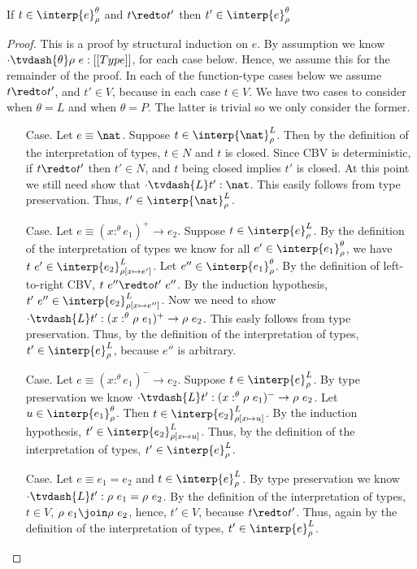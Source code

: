 \begin{lemma}[$\CRII$]
  \label{lemma:crii}
  If $t \in \interp{e}^\theta_\rho$ and $t \redto t'$ then $t' \in \interp{e}^\theta_\rho$
\end{lemma}
\begin{proof}
  This is a proof by structural induction on $e$.  By assumption we know 
  $\cdot \tvdash{\theta} \rho\ e:[[Type]]$, for each case below.  Hence, we assume this for
  the remainder of the proof.  In each of the function-type cases below we 
  assume $t \redto t'$, and $t' \in V$, because in each case $t \in V$.  We have two cases
  to consider when $\theta = L$ and when $\theta = P$.  The latter is trivial so we only
  consider the former.

  \begin{itemize}
  \item[Case.] Let $e \equiv \nat$.  
    Suppose $t \in \interp{\nat}^L_\rho$.  Then by the definition of the 
    interpretation of types, $t \in N$ and $t$ is closed.  Since CBV is deterministic,
    if $t \redto t'$ then $t' \in N$, and $t$ being closed implies $t'$ is closed.  At this
    point we still need show that $\cdot \tvdash{L} t':\nat$.  This easily follows from
    type preservation. Thus, $t' \in \interp{\nat}^L_\rho$.

  \item[Case.] Let $e \equiv (x :^\theta e_1)^+ \rightarrow e_2$.    
    Suppose $t \in \interp{e}^L_\rho$.  By the definition of the interpretation of types we know 
    for all $e' \in \interp{e_1}^\theta_\rho$, we have 
    $t\ e' \in \interp{e_2}^L_{\rho[x \mapsto e']}$.  
    Let $e'' \in \interp{e_1}^\theta_\rho$.  By the definition of left-to-right CBV, 
    $t\ e'' \redto t'\ e''$.  By the induction hypothesis, 
    $t'\ e'' \in \interp{e_2}^L_{\rho[x \mapsto e'']}$.  Now we need to show
    $\cdot \tvdash{L} t':(x :^\theta \rho\ e_1)^+ \rightarrow \rho\ e_2$.  This easly follows
    from type preservation.  Thus, by the definition 
    of the interpretation of types, $t' \in \interp{e}^L_{\rho}$, because $e''$ is arbitrary.
    
  \item[Case.] Let $e \equiv (x :^\theta e_1)^- \to e_2$.
    Suppose $t \in \interp{e}^L_\rho$.  By type preservation we know 
    $\cdot \tvdash{L} t':(x :^\theta \rho\ e_1)^- \to \rho\ e_2$.
    Let $u \in \interp{e_1}^\theta_\rho$. Then 
    $t \in \interp{e_2}^L_{\rho[x \mapsto u]}$.  By the induction hypothesis,
    $t' \in \interp{e_2}^L_{\rho[x \mapsto u]}$.  Thus, by the definition
    of the interpretation of types, $t' \in \interp{e}^L_\rho$.
      
  \item[Case.] Let $e \equiv e_1 = e_2$ and $t \in \interp{e}^L_\rho$.  
    By type preservation we know 
    $\cdot \tvdash{L} t':\rho\ e_1 = \rho\ e_2$.  By the definition of the 
    interpretation of types, $t \in V$, $\rho\ e_1 \join \rho\ e_2$, hence, 
    $t' \in V$, because $t \redto t'$.  Thus, again by the definition 
    of the interpretation of types, $t' \in \interp{e}^L_\rho$.    
  \end{itemize}
\end{proof}

